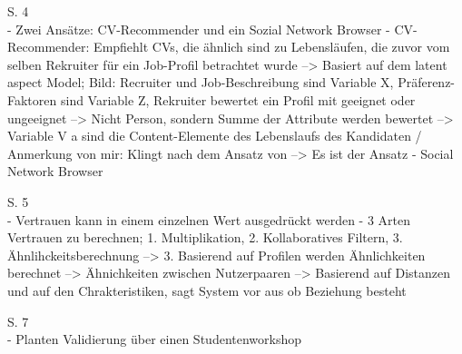 S. 4\\
- Zwei Ansätze: CV-Recommender und ein Sozial Network Browser
- CV-Recommender: Empfiehlt CVs, die ähnlich sind zu Lebensläufen, die zuvor vom selben Rekruiter für ein Job-Profil betrachtet wurde --> Basiert auf dem latent aspect Model; Bild: Recruiter und Job-Beschreibung sind Variable X, Präferenz-Faktoren sind Variable Z, Rekruiter bewertet ein Profil mit geeignet oder ungeeignet --> Nicht Person, sondern Summe der Attribute werden bewertet --> Variable V a sind die Content-Elemente des Lebenslaufs des Kandidaten / Anmerkung von mir: Klingt nach dem Ansatz von \textcite{faerber:2003} --> Es ist der Ansatz
- Social Network Browser

S. 5\\
- Vertrauen kann in einem einzelnen Wert ausgedrückt werden
- 3 Arten Vertrauen zu berechnen; 1. Multiplikation, 2. Kollaboratives Filtern, 3. Ähnlihckeitsberechnung --> 3. Basierend auf Profilen werden Ähnlichkeiten berechnet --> Ähnichkeiten zwischen Nutzerpaaren --> Basierend auf Distanzen und auf den Chrakteristiken, sagt System vor aus ob Beziehung besteht

S. 7\\
- Planten Validierung über einen Studentenworkshop
